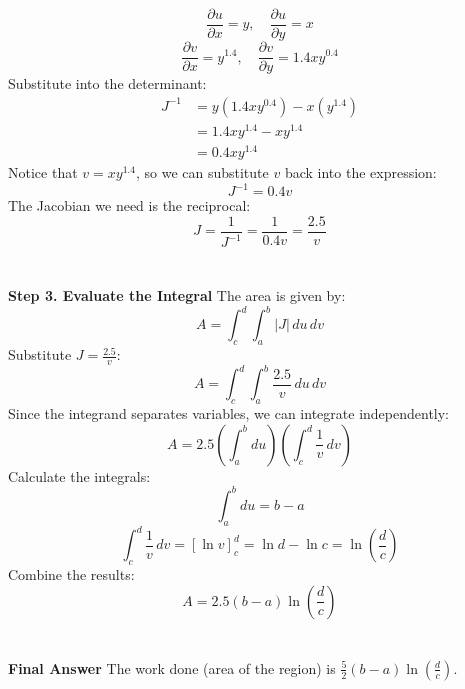 \documentclass{article}
\begin{document}
\[ \frac{\partial u}{\partial x} = y, \quad \frac{\partial u}{\partial y} = x \]
\[ \frac{\partial v}{\partial x} = y^{1.4}, \quad \frac{\partial v}{\partial y} = 1.4xy^{0.4} \]
Substitute into the determinant:
\begin{align*}
	J^{-1} & = y(1.4xy^{0.4}) - x(y^{1.4}) \\
	       & = 1.4xy^{1.4} - xy^{1.4}      \\
	       & = 0.4xy^{1.4}
\end{align*}
Notice that $v = xy^{1.4}$, so we can substitute $v$ back into the expression:
\[ J^{-1} = 0.4v \]
The Jacobian we need is the reciprocal:
\[ J = \frac{1}{J^{-1}} = \frac{1}{0.4v} = \frac{2.5}{v} \]
\\
\\
\textbf{Step 3. Evaluate the Integral}
The area is given by:
\[
	A = \int_c^d \int_a^b |J| \, du \, dv
\]
Substitute $J = \frac{2.5}{v}$:
\[
	A = \int_c^d \int_a^b \frac{2.5}{v} \, du \, dv
\]
Since the integrand separates variables, we can integrate independently:
\[
	A = 2.5 \left( \int_a^b du \right) \left( \int_c^d \frac{1}{v} \, dv \right)
\]
Calculate the integrals:
\[ \int_a^b du = b - a \]
\[ \int_c^d \frac{1}{v} \, dv = [\ln v]_c^d = \ln d - \ln c = \ln\left(\frac{d}{c}\right) \]
Combine the results:
\[
	A = 2.5(b - a) \ln\left(\frac{d}{c}\right)
\]
\\
\\
\textbf{Final Answer} The work done (area of the region) is
$\frac{5}{2}(b - a) \ln\left(\frac{d}{c}\right)$.

\pagebreak

\end{document}
